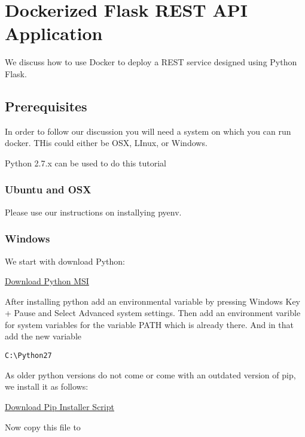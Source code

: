 

\section{Dockerized Flask REST API Application}
\label{s:docker-flask-rest} 
\FILENAME

We discuss how to use Docker to deploy a REST service designed using
Python Flask.

\subsection{Prerequisites}

In order to follow our discussion you will need a system on which you
can run docker. THis could either be OSX, LInux, or Windows.

\begin{NOTE}
  Python 2.7.x can be used to do this tutorial
\end{NOTE}


\subsubsection{Ubuntu and OSX}

Please use our instructions on installying pyenv.

\subsubsection{Windows}

We start with download Python:

\href{https://www.python.org/ftp/python/2.7.14/python-2.7.14.msi}{Download
Python MSI}

After installing python add an environmental variable by pressing
Windows Key + Pause and Select Advanced system settings. Then add an
environment varible for system variables for the variable PATH which is
already there. And in that add the new variable

\begin{lstlisting}
C:\Python27
\end{lstlisting}

As older python versions do not come or come with an outdated version of
pip, we install it as follows:

\href{https://bootstrap.pypa.io/get-pip.py}{Download Pip Installer
Script}

Now copy this file to

